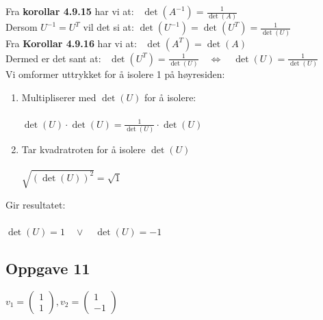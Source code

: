 \documentclass{article}
\newcommand{\vect}[1]{\begin{pmatrix} #1 \end{pmatrix}}
\newcommand{\uu}[1]{\underline{\underline{#1}}}
\newcommand{\eq}{\quad\Longleftrightarrow\quad}
\begin{document}
Fra \textbf{korollar 4.9.15} har vi at: \qquad \ \(\det(A^{-1}) = \frac{1}{\det(A)}\) \\

Dersom \(U^{-1} = U^T\) vil det si at: \qquad \(\det(U^{-1}) = \det(U^T) = \frac{1}{\det(U)}\)  \\

Fra \textbf{Korollar 4.9.16} har vi at: \qquad \ 
\(\det(A^T) = \det(A)\) \\

Dermed er det sant at: \qquad \qquad \qquad  \ \(\det(U^T) = \frac{1}{\det(U)} \eq \det(U) = \frac{1}{\det(U)}\) \\

Vi omformer uttrykket for å isolere 1 på høyresiden: \\
\begin{enumerate}
    \item Multipliserer med $\det(U)$ for å isolere: \\\\
    \(\det(U) \cdot \det(U) = \frac{1}{\det(U)} \cdot \det(U)\) \\
    \item Tar kvadratroten for å isolere $\det(U)$ \\\\
    \(\sqrt{(\det(U))^2} = \sqrt{1}\)
\end{enumerate}

Gir resultatet:\\\\
\uu{\(\det(U) = 1 \quad \vee \quad \det(U) = -1\)}

\subsection*{Oppgave 11}
\(
v_1 = \vect{1\\1},
v_2 = \vect{1\\-1}
\)
\end{document}
